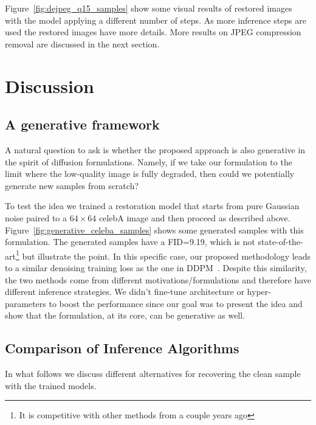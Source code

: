 \documentclass[10pt]{article} %
\begin{document}


Figure~\ref{fig:dejpeg_q15_samples} show some visual results of restored images with the model applying a different number of steps. As more inference steps are used the restored images have more details. More results on JPEG compression removal are discussed in the next section.


\section{Discussion}


\subsection{A generative framework}
\label{sec:is_generative}



A natural question to ask is whether the proposed approach is also generative in the spirit of diffusion formulations. Namely, if we take our formulation to the limit where the low-quality image is fully degraded, then could we potentially generate new samples from scratch? 

To test the idea we trained a restoration model that starts from pure Gaussian noise paired to a $64\times64$ celebA image and then proceed as described above. Figure~\ref{fig:generative_celeba_samples} shows some generated samples with this formulation. The generated samples have a FID=9.19, which is not state-of-the-art\footnote{It
is competitive with other methods from a couple years ago} but illustrate the point. In this specific case, our proposed methodology leads to a similar denoising training loss as the one in DDPM~\citep{ho2020denoising}. Despite this similarity, the two methods come from different motivations/formulations and therefore have different inference strategies. We didn't fine-tune architecture or hyper-parameters to boost the performance since our goal was to present the idea and show that the formulation, at its core, can be generative as well.

\subsection{Comparison of Inference Algorithms}
\label{sec:exp_samplers}

In what follows we  discuss different alternatives for recovering the clean sample with the trained models.
\end{document}
